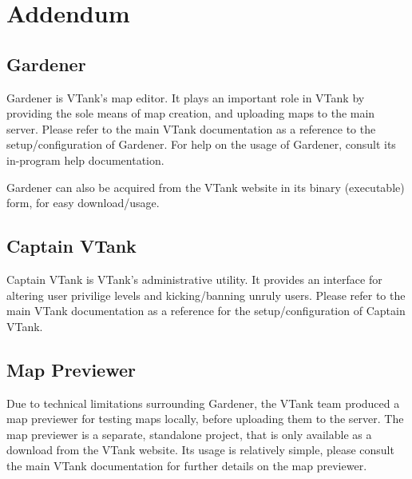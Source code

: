 \chapter{Addendum}

\section{Gardener}
Gardener is VTank's map editor.  It plays an important role in VTank by providing the sole means of map creation, and uploading maps to the main server. Please refer to the main VTank documentation as a reference to the setup/configuration of Gardener.  For help on the usage of Gardener, consult its in-program help documentation.

Gardener can also be acquired from the VTank website in its binary (executable) form, for easy download/usage.

\section{Captain VTank}

Captain VTank is VTank's administrative utility.  It provides an interface for altering user privilige levels and kicking/banning unruly users. Please refer to the main VTank documentation as a reference for the setup/configuration of Captain VTank.

\section{Map Previewer}

Due to technical limitations surrounding Gardener, the VTank team produced a map previewer for testing maps locally, before uploading them to the server.  The map previewer is a separate, standalone project, that is only available as a download from the VTank website.  Its usage is relatively simple, please consult the main VTank documentation for further details on the map previewer.